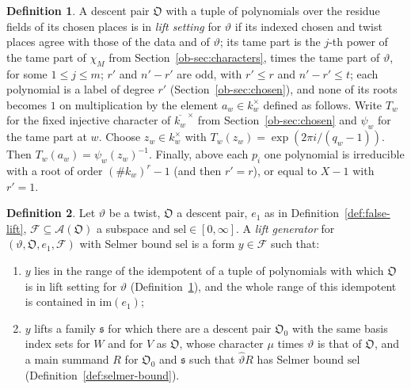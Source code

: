 \documentclass[reqno]{amsart}
\theoremstyle{definition}
\newtheorem{definition}{Definition}[section]
\theoremstyle{plain}
\newcommand{\DP}{\mathfrak{O}}
\begin{document}
\begin{definition}\label{def:lift-setting}
A descent pair \(\DP\) with a tuple of polynomials over the residue fields of its chosen places is in \emph{lift setting} for \(\vartheta\) if its indexed chosen and twist places agree with those of the data and of \(\vartheta\); its tame part is the \(j\)-th power of the tame part of \(\chi_M\) from Section~\ref{ob-sec:characters}, times the tame part of \(\vartheta\), for some \(1 \le j \le m\); \(r'\) and \(n' - r'\) are odd, with \(r' \le r\) and \(n' - r' \le t\); each polynomial is a label of degree \(r'\) (Section~\ref{ob-sec:chosen}), and none of its roots becomes \(1\) on multiplication by the element \(a_w\in k_w^\times\) defined as follows.  Write \(T_w\) for the fixed injective character of \(\overline{k_w}^{\,\times}\) from Section~\ref{ob-sec:chosen} and \(\psi_w\) for the tame part at \(w\).  Choose \(z_w\in k_w^\times\) with \(T_w(z_w)=\exp(2\pi i/(q_w-1))\).  Then \(T_w(a_w)=\psi_w(z_w)^{-1}\).  Finally, above each \(p_i\) one polynomial is irreducible with a root of order \((\#k_w)^{r} - 1\) (and then \(r' = r\)), or equal to \(X - 1\) with \(r' = 1\).
\end{definition}

\begin{definition}\label{def:lift-generator}
Let \(\vartheta\) be a twist, \(\DP\) a descent pair, \(e_1\) as in Definition~\ref{def:false-lift}, \(\mathcal F \subseteq \mathcal A(\DP)\) a subspace and \(\mathrm{sel} \in [0, \infty]\).  A \emph{lift generator} for \((\vartheta, \DP, e_1, \mathcal F)\) with Selmer bound \(\mathrm{sel}\) is a form \(y \in \mathcal F\) such that:
\begin{enumerate}
\item[(a)] \(y\) lies in the range of the idempotent of a tuple of polynomials with which \(\DP\) is in lift setting for \(\vartheta\) (Definition~\ref{def:lift-setting}), and the whole range of this idempotent is contained in \(\mathrm{im}(e_1)\);
\item[(b)] \(y\) lifts a family \(\mathfrak s\) for which there are a descent pair \(\DP_0\) with the same basis index sets for \(W\) and for \(V\) as \(\DP\), whose character \(\mu\) times \(\vartheta\) is that of \(\DP\), and a main summand \(R\) for \(\DP_0\) and \(\mathfrak s\) such that \(\hat\vartheta R\) has Selmer bound \(\mathrm{sel}\) (Definition~\ref{def:selmer-bound}).
\end{enumerate}
\end{definition}
\end{document}
